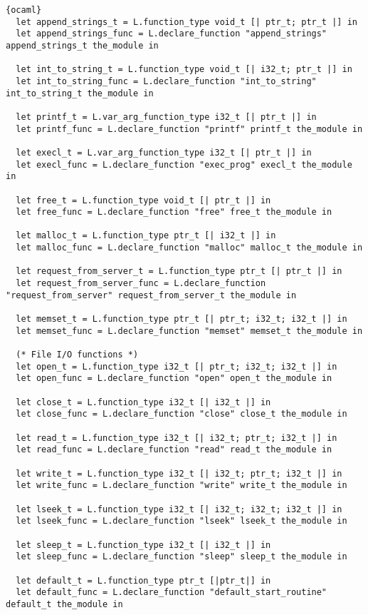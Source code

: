 \begin{lstlisting}{ocaml}
  let append_strings_t = L.function_type void_t [| ptr_t; ptr_t |] in
  let append_strings_func = L.declare_function "append_strings" append_strings_t the_module in

  let int_to_string_t = L.function_type void_t [| i32_t; ptr_t |] in
  let int_to_string_func = L.declare_function "int_to_string" int_to_string_t the_module in

  let printf_t = L.var_arg_function_type i32_t [| ptr_t |] in
  let printf_func = L.declare_function "printf" printf_t the_module in

  let execl_t = L.var_arg_function_type i32_t [| ptr_t |] in
  let execl_func = L.declare_function "exec_prog" execl_t the_module in

  let free_t = L.function_type void_t [| ptr_t |] in
  let free_func = L.declare_function "free" free_t the_module in

  let malloc_t = L.function_type ptr_t [| i32_t |] in
  let malloc_func = L.declare_function "malloc" malloc_t the_module in

  let request_from_server_t = L.function_type ptr_t [| ptr_t |] in
  let request_from_server_func = L.declare_function "request_from_server" request_from_server_t the_module in

  let memset_t = L.function_type ptr_t [| ptr_t; i32_t; i32_t |] in
  let memset_func = L.declare_function "memset" memset_t the_module in

  (* File I/O functions *)
  let open_t = L.function_type i32_t [| ptr_t; i32_t; i32_t |] in
  let open_func = L.declare_function "open" open_t the_module in

  let close_t = L.function_type i32_t [| i32_t |] in
  let close_func = L.declare_function "close" close_t the_module in

  let read_t = L.function_type i32_t [| i32_t; ptr_t; i32_t |] in
  let read_func = L.declare_function "read" read_t the_module in

  let write_t = L.function_type i32_t [| i32_t; ptr_t; i32_t |] in
  let write_func = L.declare_function "write" write_t the_module in 

  let lseek_t = L.function_type i32_t [| i32_t; i32_t; i32_t |] in
  let lseek_func = L.declare_function "lseek" lseek_t the_module in

  let sleep_t = L.function_type i32_t [| i32_t |] in
  let sleep_func = L.declare_function "sleep" sleep_t the_module in

  let default_t = L.function_type ptr_t [|ptr_t|] in
  let default_func = L.declare_function "default_start_routine" default_t the_module in


\end{lstlisting}
